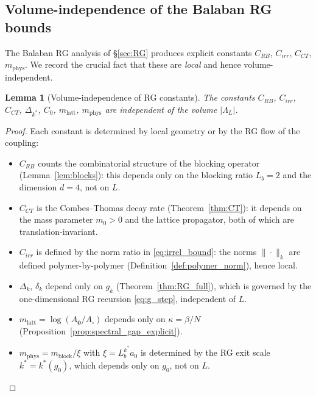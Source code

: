 \documentclass[11pt,a4paper]{amsart}
\newtheorem{lemma}[theorem]{Lemma}
\theoremstyle{definition}
\begin{document}
\subsection{Volume-independence of the Balaban RG bounds}
\label{sec:infvol_uniform}

The Balaban RG analysis of \S\ref{sec:RG} produces explicit constants $C_{RB}$,
$C_{irr}$, $C_{CT}$, $m_{\mathrm{phys}}$.  We record the crucial fact that these
are \emph{local} and hence volume-independent.

\begin{lemma}[Volume-independence of RG constants]
\label{lem:vol_independent}
The constants $C_{RB}$, $C_{irr}$, $C_{CT}$, $\Delta_{k^*}$, $C_0$,
$m_{\mathrm{latt}}$, $m_{\mathrm{phys}}$ are independent of the volume $|\Lambda_L|$.
\end{lemma}

\begin{proof}
Each constant is determined by local geometry or by the RG flow of the coupling:
\begin{itemize}
\item $C_{RB}$ counts the combinatorial structure of the blocking operator
  (Lemma~\ref{lem:blocks}): this depends only on the blocking ratio $L_b=2$
  and the dimension $d=4$, not on $L$.
\item $C_{CT}$ is the Combes--Thomas decay rate
  (Theorem~\ref{thm:CT}): it depends on the mass parameter $m_0 > 0$ and
  the lattice propagator, both of which are translation-invariant.
\item $C_{irr}$ is defined by the norm ratio in \eqref{eq:irrel_bound}: the norms
  $\|\cdot\|_k$ are defined polymer-by-polymer
  (Definition~\ref{def:polymer_norm}), hence local.
\item $\Delta_k$, $\delta_k$ depend only on $g_k$ (Theorem~\ref{thm:RG_full}),
  which is governed by the one-dimensional RG recursion
  \eqref{eq:g_step}, independent of $L$.
\item $m_{\mathrm{latt}} = \log(A_\mathbf{0}/A_\square)$ depends only on $\kappa = \beta/N$
  (Proposition~\ref{prop:spectral_gap_explicit}).
\item $m_{\mathrm{phys}} = m_{\mathrm{block}}/\xi$ with $\xi = L_b^{k^*}a_0$ is
  determined by the RG exit scale $k^* = k^*(g_0)$, which depends only on $g_0$,
  not on $L$.
\end{itemize}
\end{proof}
\end{document}
